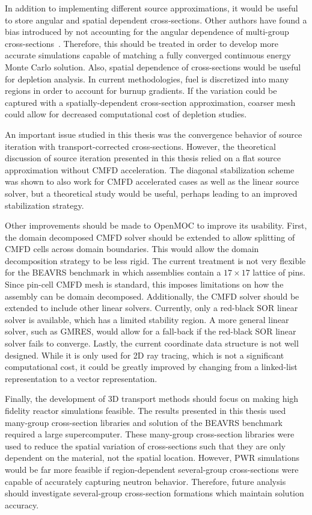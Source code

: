 \documentclass[12pt,twoside]{mitthesis-exec}
\begin{document}
In addition to implementing different source approximations, it would be useful to store angular and spatial dependent cross-sections. Other authors have found a bias introduced by not accounting for the angular dependence of multi-group cross-sections~\cite{gibson-preprint}. Therefore, this should be treated in order to develop more accurate simulations capable of matching a fully converged continuous energy Monte Carlo solution. Also, spatial dependence of cross-sections would be useful for depletion analysis. In current methodologies, fuel is discretized into many regions in order to account for burnup gradients. If the variation could be captured with a spatially-dependent cross-section approximation, coarser mesh could allow for decreased computational cost of depletion studies.

An important issue studied in this thesis was the convergence behavior of source iteration with transport-corrected cross-sections. However, the theoretical discussion of source iteration presented in this thesis relied on a flat source approximation without CMFD acceleration. The diagonal stabilization scheme was shown to also work for CMFD accelerated cases as well as the linear source solver, but a theoretical study would be useful, perhaps leading to an improved stabilization strategy.

Other improvements should be made to OpenMOC to improve its usability. First, the domain decomposed CMFD solver should be extended to allow splitting of CMFD cells across domain boundaries. This would allow the domain decomposition strategy to be less rigid. The current treatment is not very flexible for the BEAVRS benchmark in which assemblies contain a $17 \times 17$ lattice of pins. Since pin-cell CMFD mesh is standard, this imposes limitations on how the assembly can be domain decomposed. Additionally, the CMFD solver should be extended to include other linear solvers. Currently, only a red-black SOR linear solver is available, which has a limited stability region. A more general linear solver, such as GMRES, would allow for a fall-back if the red-black SOR linear solver fails to converge. Lastly, the current coordinate data structure is not well designed. While it is only used for 2D ray tracing, which is not a significant computational cost, it could be greatly improved by changing from a linked-list representation to a vector representation.

Finally, the development of 3D transport methods should focus on making high fidelity reactor simulations feasible. The results presented in this thesis used many-group cross-section libraries and solution of the BEAVRS benchmark required a large supercomputer. These many-group cross-section libraries were used to reduce the spatial variation of cross-sections such that they are only dependent on the material, not the spatial location. However, PWR simulations would be far more feasible if region-dependent several-group cross-sections were capable of accurately capturing neutron behavior. Therefore, future analysis should investigate several-group cross-section formations which maintain solution accuracy.


\begin{singlespace}


\end{singlespace}
\end{document}
